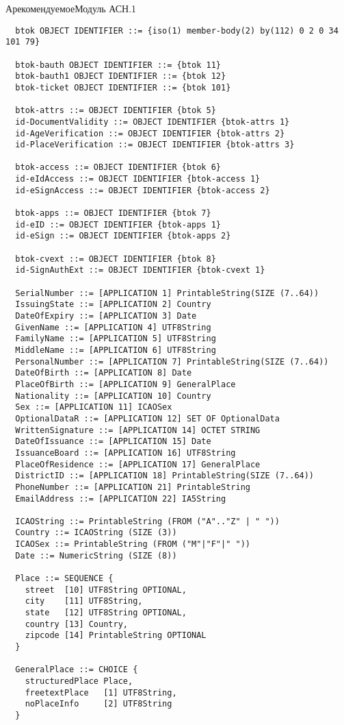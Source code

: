 \begin{appendix}{А}{рекомендуемое}{Модуль АСН.1}
\begin{verbatim}
  btok OBJECT IDENTIFIER ::= {iso(1) member-body(2) by(112) 0 2 0 34 101 79}

  btok-bauth OBJECT IDENTIFIER ::= {btok 11}
  btok-bauth1 OBJECT IDENTIFIER ::= {btok 12}
  btok-ticket OBJECT IDENTIFIER ::= {btok 101}

  btok-attrs ::= OBJECT IDENTIFIER {btok 5}
  id-DocumentValidity ::= OBJECT IDENTIFIER {btok-attrs 1}
  id-AgeVerification ::= OBJECT IDENTIFIER {btok-attrs 2}
  id-PlaceVerification ::= OBJECT IDENTIFIER {btok-attrs 3}

  btok-access ::= OBJECT IDENTIFIER {btok 6}
  id-eIdAccess ::= OBJECT IDENTIFIER {btok-access 1}
  id-eSignAccess ::= OBJECT IDENTIFIER {btok-access 2}

  btok-apps ::= OBJECT IDENTIFIER {btok 7}
  id-eID ::= OBJECT IDENTIFIER {btok-apps 1}
  id-eSign ::= OBJECT IDENTIFIER {btok-apps 2}

  btok-cvext ::= OBJECT IDENTIFIER {btok 8}
  id-SignAuthExt ::= OBJECT IDENTIFIER {btok-cvext 1}

  SerialNumber ::= [APPLICATION 1] PrintableString(SIZE (7..64))
  IssuingState ::= [APPLICATION 2] Country
  DateOfExpiry ::= [APPLICATION 3] Date
  GivenName ::= [APPLICATION 4] UTF8String
  FamilyName ::= [APPLICATION 5] UTF8String
  MiddleName ::= [APPLICATION 6] UTF8String
  PersonalNumber ::= [APPLICATION 7] PrintableString(SIZE (7..64))
  DateOfBirth ::= [APPLICATION 8] Date
  PlaceOfBirth ::= [APPLICATION 9] GeneralPlace
  Nationality ::= [APPLICATION 10] Country
  Sex ::= [APPLICATION 11] ICAOSex
  OptionalDataR ::= [APPLICATION 12] SET OF OptionalData
  WrittenSignature ::= [APPLICATION 14] OCTET STRING
  DateOfIssuance ::= [APPLICATION 15] Date
  IssuanceBoard ::= [APPLICATION 16] UTF8String
  PlaceOfResidence ::= [APPLICATION 17] GeneralPlace
  DistrictID ::= [APPLICATION 18] PrintableString(SIZE (7..64))
  PhoneNumber ::= [APPLICATION 21] PrintableString
  EmailAddress ::= [APPLICATION 22] IA5String
  
  ICAOString ::= PrintableString (FROM ("A".."Z" | " "))
  Country ::= ICAOString (SIZE (3))
  ICAOSex ::= PrintableString (FROM ("M"|"F"|" "))
  Date ::= NumericString (SIZE (8))
  
  Place ::= SEQUENCE {
    street  [10] UTF8String OPTIONAL,
    city    [11] UTF8String,
    state   [12] UTF8String OPTIONAL,
    country [13] Country,
    zipcode [14] PrintableString OPTIONAL
  }
  
  GeneralPlace ::= CHOICE {
    structuredPlace Place,
    freetextPlace   [1] UTF8String,
    noPlaceInfo     [2] UTF8String
  }
  

\end{verbatim}
\end{appendix}
